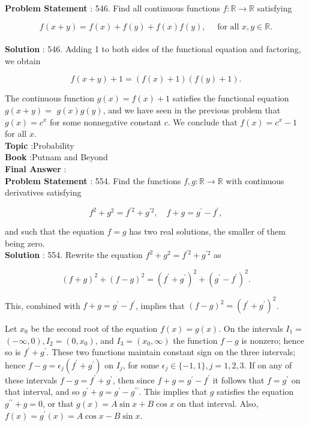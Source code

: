 \documentclass[10pt]{article}
\begin{document}
\textbf{Problem Statement} :
546. Find all continuous functions $f: \mathbb{R} \rightarrow \mathbb{R}$ satisfying

$$
f(x+y)=f(x)+f(y)+f(x) f(y), \quad \text { for all } x, y \in \mathbb{R} .
$$
\\
\textbf{Solution} :
546. Adding 1 to both sides of the functional equation and factoring, we obtain

$$
f(x+y)+1=(f(x)+1)(f(y)+1) .
$$

The continuous function $g(x)=f(x)+1$ satisfies the functional equation $g(x+y)=$ $g(x) g(y)$, and we have seen in the previous problem that $g(x)=c^{x}$ for some nonnegative constant $c$. We conclude that $f(x)=c^{x}-1$ for all $x$.
\\
\textbf{Topic} :Probability\\
\textbf{Book} :Putnam and Beyond\\
\textbf{Final Answer} :\\


\textbf{Problem Statement} :
554. Find the functions $f, g: \mathbb{R} \rightarrow \mathbb{R}$ with continuous derivatives satisfying

$$
f^{2}+g^{2}=f^{\prime 2}+g^{\prime 2}, \quad f+g=g^{\prime}-f^{\prime},
$$

and such that the equation $f=g$ has two real solutions, the smaller of them being zero.
\\
\textbf{Solution} :
554. Rewrite the equation $f^{2}+g^{2}=f^{\prime 2}+g^{\prime 2}$ as

$$
(f+g)^{2}+(f-g)^{2}=\left(f^{\prime}+g^{\prime}\right)^{2}+\left(g^{\prime}-f^{\prime}\right)^{2} .
$$

This, combined with $f+g=g^{\prime}-f^{\prime}$, implies that $(f-g)^{2}=\left(f^{\prime}+g^{\prime}\right)^{2}$.

Let $x_{0}$ be the second root of the equation $f(x)=g(x)$. On the intervals $I_{1}=$ $(-\infty, 0), I_{2}=\left(0, x_{0}\right)$, and $I_{3}=\left(x_{0}, \infty\right)$ the function $f-g$ is nonzero; hence so is $f^{\prime}+g^{\prime}$. These two functions maintain constant sign on the three intervals; hence $f-g=\epsilon_{j}\left(f^{\prime}+g^{\prime}\right)$ on $I_{j}$, for some $\epsilon_{j} \in\{-1,1\}, j=1,2,3$. If on any of these intervals $f-g=f^{\prime}+g^{\prime}$, then since $f+g=g^{\prime}-f^{\prime}$ it follows that $f=g^{\prime}$ on that interval, and so $g^{\prime}+g=g^{\prime}-g^{\prime \prime}$. This implies that $g$ satisfies the equation $g^{\prime \prime}+g=0$, or that $g(x)=A \sin x+B \cos x$ on that interval. Also, $f(x)=g^{\prime}(x)=A \cos x-B \sin x$.
\end{document}
